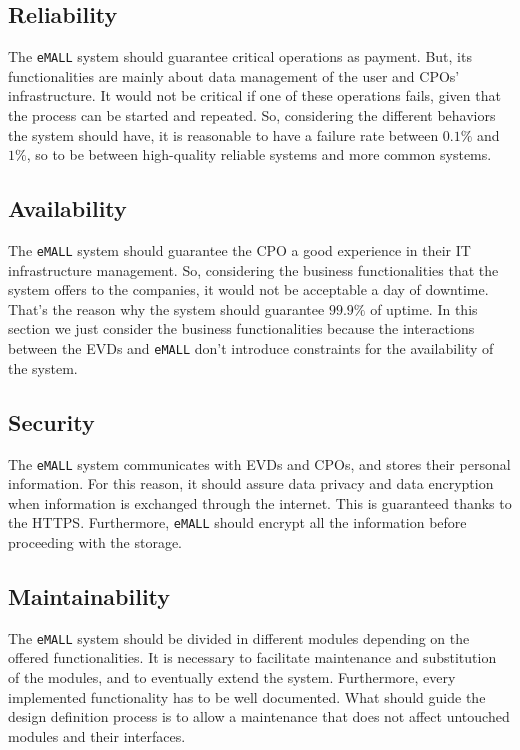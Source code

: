 \subsection{Reliability}
\label{subsec:reliability}%
The \verb|eMALL| system should guarantee critical operations as payment.
But, its functionalities are mainly about data management of the user and CPOs' infrastructure.
It would not be critical if one of these operations fails, given that the process can be started and repeated.
So, considering the different behaviors the system should have, it is reasonable to have a failure rate
between $0.1\%$ and $1\%$, so to be between high-quality reliable systems and more common systems.

\subsection{Availability}
\label{subsec:availability}%
The \verb|eMALL| system should guarantee the CPO a good experience in their IT infrastructure management.
So, considering the business functionalities that the system offers to the companies, it would not be acceptable a day of downtime.
That's the reason why the system should guarantee $99.9\%$ of uptime.
In this section we just consider the business functionalities because the interactions between the EVDs and \verb|eMALL|
don't introduce constraints for the availability of the system.

\subsection{Security}
\label{subsec:security}%
The \verb|eMALL| system communicates with EVDs and CPOs, and stores their personal information.
For this reason, it should assure data privacy and data encryption when information is exchanged through the internet.
This is guaranteed thanks to the HTTPS\@.
Furthermore, \verb|eMALL| should encrypt all the information before proceeding with the storage.

\subsection{Maintainability}
\label{subsec:maintainability}%
The \verb|eMALL| system should be divided in different modules depending on the offered functionalities.
It is necessary to facilitate maintenance and substitution of the modules, and to eventually extend the system.
Furthermore, every implemented functionality has to be well documented.
What should guide the design definition process is to allow a maintenance that does not affect untouched modules and their interfaces.

